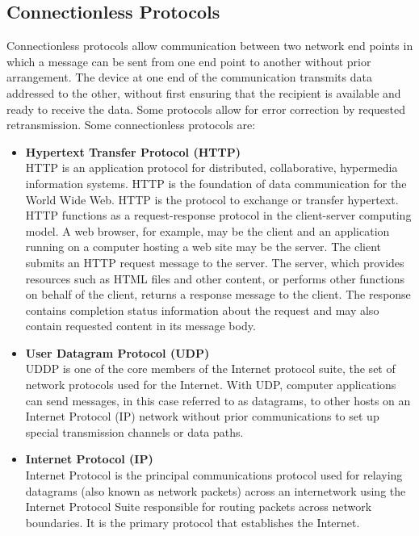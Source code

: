 \subsection{Connectionless Protocols}
Connectionless protocols allow communication between two network end points in which a message can be sent from one end point to another without prior arrangement. The device at one end of the communication transmits data addressed to the other, without first ensuring that the recipient is available and ready to receive the data. Some protocols allow for error correction by requested retransmission. Some connectionless protocols are:
\begin{itemize}
	\item \textbf{Hypertext Transfer Protocol (HTTP)}\\
	HTTP is an application protocol for distributed, collaborative, hypermedia information systems.
	HTTP is the foundation of data communication for the World Wide Web. HTTP is the protocol to exchange or transfer hypertext.
	HTTP functions as a request-response protocol in the client-server computing model. A web browser, for example, may be the client and an application running on a computer hosting a web site may be the server. The client submits an HTTP request message to the server. The server, which provides resources such as HTML files and other content, or performs other functions on behalf of the client, returns a response message to the client. The response contains completion status information about the request and may also contain requested content in its message body.
	\item \textbf{User Datagram Protocol (UDP)}\\
	UDDP is one of the core members of the Internet protocol suite, the set of network protocols used for the Internet. With UDP, computer applications can send messages, in this case referred to as datagrams, to other hosts on an Internet Protocol (IP) network without prior communications to set up special transmission channels or data paths.
	\item \textbf{Internet Protocol (IP)}\\
	Internet Protocol is the principal communications protocol used for relaying datagrams (also known as network packets) across an internetwork using the Internet Protocol Suite responsible for routing packets across network boundaries. It is the primary protocol that establishes the Internet.
\end{itemize}
